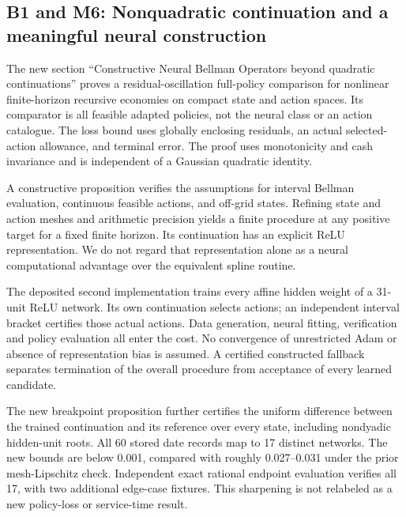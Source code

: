 \documentclass[
  11pt,
]{article}
\begin{document}
\hypertarget{b1-and-m6-nonquadratic-continuation-and-a-meaningful-neural-construction}{%
\subsection{B1 and M6: Nonquadratic continuation and a meaningful neural
construction}\label{b1-and-m6-nonquadratic-continuation-and-a-meaningful-neural-construction}}

The new section ``Constructive Neural Bellman Operators beyond quadratic
continuations'' proves a residual-oscillation full-policy comparison for
nonlinear finite-horizon recursive economies on compact state and action
spaces. Its comparator is all feasible adapted policies, not the neural
class or an action catalogue. The loss bound uses globally enclosing
residuals, an actual selected-action allowance, and terminal error. The
proof uses monotonicity and cash invariance and is independent of a
Gaussian quadratic identity.

A constructive proposition verifies the assumptions for interval Bellman
evaluation, continuous feasible actions, and off-grid states. Refining
state and action meshes and arithmetic precision yields a finite
procedure at any positive target for a fixed finite horizon. Its
continuation has an explicit ReLU representation. We do not regard that
representation alone as a neural computational advantage over the
equivalent spline routine.

The deposited second implementation trains every affine hidden weight of
a 31-unit ReLU network. Its own continuation selects actions; an
independent interval bracket certifies those actual actions. Data
generation, neural fitting, verification and policy evaluation all enter
the cost. No convergence of unrestricted Adam or absence of
representation bias is assumed. A certified constructed fallback
separates termination of the overall procedure from acceptance of every
learned candidate.

The new breakpoint proposition further certifies the uniform difference
between the trained continuation and its reference over every state,
including nondyadic hidden-unit roots. All 60 stored date records map to
17 distinct networks. The new bounds are below 0.001, compared with
roughly 0.027--0.031 under the prior mesh-Lipschitz check. Independent
exact rational endpoint evaluation verifies all 17, with two additional
edge-case fixtures. This sharpening is not relabeled as a new
policy-loss or service-time result.
\end{document}
